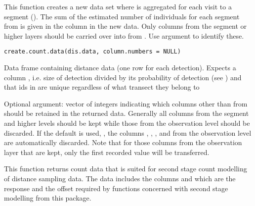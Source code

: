 \documentclass[a4paper]{book}
\begin{document}
%
\begin{Description}\relax
This function creates a new data set where  is aggregated for 
each visit to a segment (). The sum of the estimated number 
of individuals for each segment from  is given in the 
column  in the new data. 
Only columns from the segment or higher layers should be carried over into 
 from . Use argument  to 
identify these.
\end{Description}
%
\begin{Usage}
\begin{verbatim}
create.count.data(dis.data, column.numbers = NULL)
\end{verbatim}
\end{Usage}
%
\begin{Arguments}
\begin{ldescription}
\item[\code{dis.data}] Data frame containing distance data (one row for each detection). Expects a column , i.e. size of detection divided by its probability of detection (see ) and that ids in  are unique regardless of what transect they belong to

\item[\code{column.numbers}] Optional argument: vector of integers indicating which columns other than  from  should be retained in the returned data. Generally all columns from the segment and higher levels should be kept while those from the observation level should be discarded. If the default is used, , the columns , , ,  and  from the observation level are automatically discarded. Note that for those columns from the observation layer that are kept, only the first recorded value will be transferred.
\end{ldescription}
\end{Arguments}
%
\begin{Value}
This function returns count data that is suited for second stage count modelling of distance sampling 
data. The data includes the columns  and  which are the response and
the offset required by functions concerned with second stage modelling from this package.
\end{Value}
\end{document}
